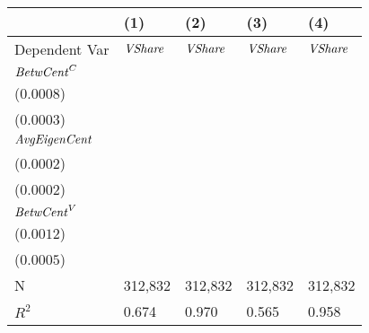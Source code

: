 \begin{tabular}{lllll}
\toprule
{} &                                      (1) &                                      (2) &                                      (3) &                                      (4) \\
\midrule
Dependent Var        &                           ${\it VShare}$ &                           ${\it VShare}$ &                           ${\it VShare}$ &                           ${\it VShare}$ \\
${\it BetwCent}^C$   &  \makecell{$0.6724^{***}$ \\ ($0.0008$)} &  \makecell{$0.2563^{***}$ \\ ($0.0003$)} &                              \makecell{} &                              \makecell{} \\
${\it AvgEigenCent}$ &                              \makecell{} &  \makecell{$0.3970^{***}$ \\ ($0.0002$)} &                              \makecell{} &  \makecell{$0.4261^{***}$ \\ ($0.0002$)} \\
${\it BetwCent}^V$   &                              \makecell{} &                              \makecell{} &  \makecell{$0.7557^{***}$ \\ ($0.0012$)} &  \makecell{$0.2581^{***}$ \\ ($0.0005$)} \\
\midrule N           &                                  312,832 &                                  312,832 &                                  312,832 &                                  312,832 \\
$R^2$                &                                    0.674 &                                    0.970 &                                    0.565 &                                    0.958 \\
\bottomrule
\end{tabular}
